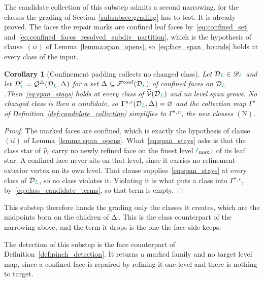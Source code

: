 \documentclass[a4paper, 12pt]{article}
\makeatletter
\newcommand{\quadriF}{\mathcal{Q}^{\triangle}}                   %
\newcommand{\collectC}{\Gamma^{s}}                               %
\newcommand{\lmaxIdx}[1]{\l_{\max,#1}}
\newcommand{\green}{\color{ForestGreen}}
\newcommand{\brickred}{\color{BrickRed}}
\newcommand{\V}{\mathcal{V}}
\newcommand{\F}{\mathcal{F}}
\DeclareRobustCommand{\simplexsubsetTwo}[2][]{\Delta\ifx\@empty#1\@empty\else^{#1}\fi_{#2}}
\newcommand{\vertexClass}[1]{\widehat{v}_{#1}}
\newcommand{\vertexClasses}{\widehat{\V}}
\newcommand{\coarseIdxone}{{\brickred i}}
\renewcommand{\l}{{\green\ell}}
\renewcommand{\L}{{\green L}}
\newtheorem{corollary}[theorem]{Corollary}
\theoremstyle{definition}
\theoremstyle{plain}
\numberwithin{equation}{section}
\DeclareRobustCommand{\domseq}[1][]{\mathcal{D}\ifx\@empty#1\@empty\else_{#1}\fi}
\newcommand{\alldomseqs}{\mathscr{D}}
\makeatother
\begin{document}
The candidate collection of this substep admits a second narrowing, for the classes the grading of Section~\ref{subsubsec:grading} has to test. It is already proved. The faces the repair marks are confined leaf faces by~\eqref{eq:confined_set} and~\eqref{eq:confined_faces_resolved_subdiv_partition}, which is the hypothesis of clause~$(ii)$ of Lemma~\ref{lemma:span_opens}, so~\eqref{eq:face_span_bounds} holds at every class of the input.

\begin{corollary}[Confinement padding collects no changed class]
    \label{cor:confined_class_candidates}
    Let $\domseq[\L] \in \alldomseqs_\L$ and let $\domseq[\L]' = \quadriF(\domseq[\L], \simplexsubsetTwo{})$ for a set $\simplexsubsetTwo{} \subseteq \F^{\mathrm{conf}}(\domseq[\L])$ of confined faces on $\domseq[\L]$.Then~\eqref{eq:span_stays} holds at every class of $\vertexClasses(\domseq[\L])$ and no level span grows. No changed class is then a candidate, so $\collectC{}^{,c}(\domseq[\L], \simplexsubsetTwo{}) = \varnothing$ and the collection map $\collectC$ of Definition~\ref{def:candidate_collection} simplifies to $\collectC{}^{,n}$, the new classes $(\mathrm{N})$.
\end{corollary}
\begin{proof}
    The marked faces are confined, which is exactly the hypothesis of clause $(ii)$ of Lemma~\ref{lemma:span_opens}. What~\eqref{eq:span_stays} asks is that the class star of $\vertexClass{\coarseIdxone}$ carry no newly refined face on the finest level $\lmaxIdx{\coarseIdxone}$ of its leaf star. A confined face never sits on that level, since it carries no refinement-exterior vertex on its own level. That clause supplies~\eqref{eq:span_stays} at every class of $\domseq[\L]$, so no class violates it. Violating it is what puts a class into $\collectC{}^{,c}$, by~\eqref{eq:class_candidate_terms}, so that term is empty.
\end{proof}

This substep therefore hands the grading only the classes it creates, which are the midpoints born on the children of $\simplexsubsetTwo{}$. This is the class counterpart of the narrowing above, and the term it drops is the one the face side keeps.

The detection of this substep is the face counterpart of Definition~\ref{def:pinch_detection}. It returns a marked family and no target level map, since a confined face is repaired by refining it one level and there is nothing to target.
\end{document}

